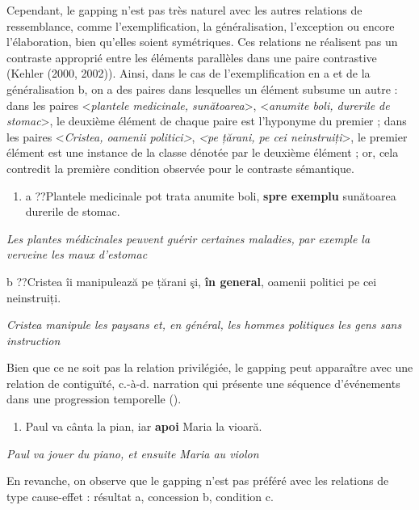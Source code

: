 Cependant, le gapping n'est pas très naturel avec les autres relations de ressemblance, comme l'exemplification, la généralisation, l'exception ou encore l'élaboration, bien qu'elles soient symétriques. Ces relations ne réalisent pas un contraste approprié entre les éléments parallèles dans une paire contrastive (Kehler (2000, 2002)). Ainsi, dans le cas de l'exemplification en a et de la généralisation b, on a des paires dans lesquelles un élément subsume un autre : dans les paires {\textless}\textit{plantele medicinale, sunătoarea}{\textgreater}, {\textless}\textit{anumite boli, durerile de stomac}{\textgreater}, le deuxième élément de chaque paire est l'hyponyme du premier ; dans les paires {\textless}\textit{Cristea, oamenii politici{\textgreater}}, \textit{{\textless}pe țărani, pe cei neinstruiți}{\textgreater}, le premier élément est une instance de la classe dénotée par le deuxième élément ; or, cela contredit la première condition observée pour le contraste sémantique. 


\begin{enumerate}
\item \label{bkm:Ref289627548}a  ??Plantele medicinale pot trata anumite boli, \textbf{spre exemplu} sunătoarea durerile de stomac.


\end{enumerate}
{\itshape
Les plantes médicinales peuvent guérir certaines maladies, par exemple la verveine les maux d'estomac } 

  b  ??Cristea îi manipulează pe țărani şi, \textbf{în general}, oamenii politici pe cei neinstruiți. 

{\itshape
Cristea manipule les paysans et, en général, les hommes politiques les gens sans instruction } 

Bien que ce ne soit pas la relation privilégiée, le gapping peut apparaître avec une relation de contiguïté, c.-à-d. narration qui présente une séquence d'événements dans une progression temporelle (\citet{Hendriks2004}). 


\begin{enumerate}
\item Paul va cânta la pian, iar \textbf{apoi} Maria la vioară.


\end{enumerate}
{\itshape
  Paul va jouer du piano, et ensuite Maria au violon } 

En revanche, on observe que le gapping n'est pas préféré avec les relations de type cause-effet : résultat a, concession b, condition c. 


